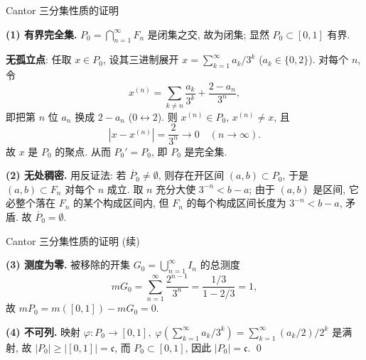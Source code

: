 
\begin{frame}{Cantor 三分集性质的证明}

\startproof[bg=yellow, fg=red]
\textbf{(1) 有界完全集.} $P_0 = \bigcap_{n=1}^\infty F_n$ 是闭集之交, 故为闭集; 显然 $P_0 \subset [0,1]$ 有界.

\pause

\textbf{无孤立点}: 任取 $x \in P_0$, 设其三进制展开 $x = \sum_{k=1}^\infty a_k/3^k$ ($a_k \in \{0, 2\}$). 对每个 $n$, 令
\[
x^{(n)} = \sum_{k \neq n} \frac{a_k}{3^k} + \frac{2 - a_n}{3^n},
\]
即把第 $n$ 位 $a_n$ 换成 $2 - a_n$ ($0 \leftrightarrow 2$). 则 $x^{(n)} \in P_0$, $x^{(n)} \neq x$, 且
\[
|x - x^{(n)}| = \frac{2}{3^n} \to 0 \quad (n \to \infty).
\]
故 $x$ 是 $P_0$ 的聚点. 从而 $P_0' = P_0$, 即 $P_0$ 是完全集.

\pause
\vspace{1em}

\textbf{(2) 无处稠密.} 用反证法: 若 $\mathring{P_0} \neq \emptyset$, 则存在开区间 $(a, b) \subset P_0$, 于是 $(a, b) \subset F_n$ 对每个 $n$ 成立. 取 $n$ 充分大使 $3^{-n} < b - a$; 由于 $(a, b)$ 是区间, 它必整个落在 $F_n$ 的某个构成区间内, 但 $F_n$ 的每个构成区间长度为 $3^{-n} < b - a$, 矛盾. 故 $\mathring{P_0} = \emptyset$.

\end{frame}


\begin{frame}{Cantor 三分集性质的证明 (续)}

\textbf{(3) 测度为零.} 被移除的开集 $G_0 = \bigcup_{n=1}^\infty I_n$ 的总测度
\[
m G_0 = \sum_{n=1}^\infty \frac{2^{n-1}}{3^n} = \frac{1/3}{1 - 2/3} = 1,
\]
故 $m P_0 = m([0,1]) - m G_0 = 0$.

\pause
\vspace{1em}

\textbf{(4) 不可列.} 映射 $\varphi: P_0 \to [0,1],\; \varphi\!\left(\sum_{k=1}^\infty a_k/3^k\right) = \sum_{k=1}^\infty (a_k/2)/2^k$ 是满射, 故 $|P_0| \geqslant |[0,1]| = \mathfrak{c}$, 而 $P_0 \subset [0,1]$, 因此 $|P_0| = \mathfrak{c}$.
\qed

\end{frame}



